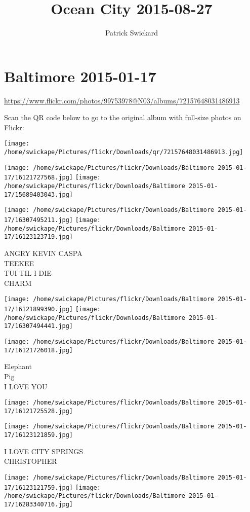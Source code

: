 \documentclass[10pt,letterpaper]{article}
\title{Ocean City 2015-08-27}
\author{Patrick Swickard}
\date{}
\begin{document}
\section*{Baltimore 2015-01-17}

\url{https://www.flickr.com/photos/99753978@N03/albums/72157648031486913}

Scan the QR code below to go to the original album with full-size photos on Flickr:

\texttt{[image: /home/swickape/Pictures/flickr/Downloads/qr/72157648031486913.jpg]}
\pagebreak

\texttt{[image: /home/swickape/Pictures/flickr/Downloads/Baltimore 2015-01-17/16121727568.jpg]}
\texttt{[image: /home/swickape/Pictures/flickr/Downloads/Baltimore 2015-01-17/15689403043.jpg]}

\texttt{[image: /home/swickape/Pictures/flickr/Downloads/Baltimore 2015-01-17/16307495211.jpg]}
\texttt{[image: /home/swickape/Pictures/flickr/Downloads/Baltimore 2015-01-17/16123123719.jpg]}

ANGRY KEVIN CASPA\\
TEEKEE\\
TUI TIL I DIE\\
CHARM
\pagebreak

\texttt{[image: /home/swickape/Pictures/flickr/Downloads/Baltimore 2015-01-17/16121899390.jpg]}
\texttt{[image: /home/swickape/Pictures/flickr/Downloads/Baltimore 2015-01-17/16307494441.jpg]}

\texttt{[image: /home/swickape/Pictures/flickr/Downloads/Baltimore 2015-01-17/16121726018.jpg]}

Elephant\\
Pig\\
I LOVE YOU
\pagebreak

\texttt{[image: /home/swickape/Pictures/flickr/Downloads/Baltimore 2015-01-17/16121725528.jpg]}

\vspace{0.25in}
\texttt{[image: /home/swickape/Pictures/flickr/Downloads/Baltimore 2015-01-17/16123121859.jpg]}

I LOVE CITY SPRINGS\\
CHRISTOPHER
\pagebreak

\texttt{[image: /home/swickape/Pictures/flickr/Downloads/Baltimore 2015-01-17/16123121759.jpg]}
\texttt{[image: /home/swickape/Pictures/flickr/Downloads/Baltimore 2015-01-17/16283340716.jpg]}
\end{document}
